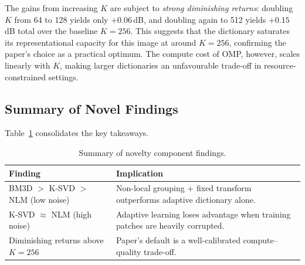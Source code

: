 The gains from increasing $K$ are subject to \emph{strong
diminishing returns}: doubling $K$ from 64 to 128 yields
only $+0.06$\,dB, and doubling again to 512 yields $+0.15$\,dB
total over the baseline $K=256$.
This suggests that the dictionary saturates its representational
capacity for this image at around $K=256$, confirming the
paper's choice as a practical optimum.
The compute cost of OMP, however, scales linearly with $K$,
making larger dictionaries an unfavourable trade-off in
resource-constrained settings.

\subsection{Summary of Novel Findings}

Table~\ref{tab:summary} consolidates the key takeaways.

\begin{table}[h]
\centering
\caption{Summary of novelty component findings.}
\label{tab:summary}
\begin{tabular}{@{}lp{5.5cm}@{}}
\toprule
Finding & Implication \\
\midrule
BM3D $>$ K-SVD $>$ NLM (low noise) &
    Non-local grouping + fixed transform outperforms adaptive
    dictionary alone. \\
K-SVD $\approx$ NLM (high noise) &
    Adaptive learning loses advantage when training patches
    are heavily corrupted. \\
Diminishing returns above $K=256$ &
    Paper's default is a well-calibrated compute--quality
    trade-off. \\
\bottomrule
\end{tabular}
\end{table}

%
